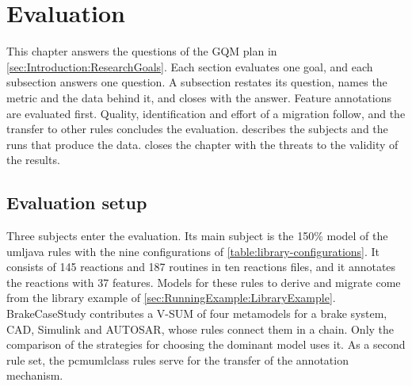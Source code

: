 \chapter{Evaluation}
\label{ch:Evaluation}

This chapter answers the questions of the GQM plan in \autoref{sec:Introduction:ResearchGoals}.
Each section evaluates one goal, and each subsection answers one question.
A subsection restates its question, names the metric and the data behind it, and closes with the answer.
Feature annotations are evaluated first.
Quality, identification and effort of a migration follow, and the transfer to other rules concludes the evaluation.
 describes the subjects and the runs that produce the data.
 closes the chapter with the threats to the validity of the results.

\section{Evaluation setup}
\label{sec:Evaluation:EvaluationSetup}

Three subjects enter the evaluation.
Its main subject is the 150\% model of the umljava rules with the nine configurations of \autoref{table:library-configurations}.
It consists of 145 reactions and 187 routines in ten reactions files, and it annotates the reactions with 37 features.
Models for these rules to derive and migrate come from the library example of \autoref{sec:RunningExample:LibraryExample}.
BrakeCaseStudy \cite{brakecasestudy-fork} contributes a V-SUM of four metamodels for a brake system, CAD, Simulink and AUTOSAR, whose rules connect them in a chain.
Only the comparison of the strategies for choosing the dominant model uses it.
As a second rule set, the pcmumlclass rules \cite{umlpcmcasestudy} serve for the transfer of the annotation mechanism.

